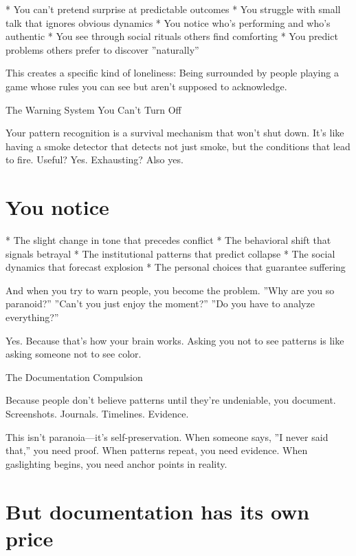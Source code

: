 \documentclass[12pt,oneside]{book}
\begin{document}
                    * You can't pretend surprise at predictable outcomes
                    * You struggle with small talk that ignores obvious dynamics
                    * You notice who's performing and who's authentic
                    * You see through social rituals others find comforting
                    * You predict problems others prefer to discover ''naturally''

This creates a specific kind of loneliness: Being surrounded by people playing a game whose rules you can see but aren't supposed to acknowledge.

The Warning System You Can't Turn Off

Your pattern recognition is a survival mechanism that won't shut down. It's like having a smoke detector that detects not just smoke, but the conditions that lead to fire. Useful? Yes. Exhausting? Also yes.

\section{You notice}

                    * The slight change in tone that precedes conflict
                    * The behavioral shift that signals betrayal
                    * The institutional patterns that predict collapse
                    * The social dynamics that forecast explosion
                    * The personal choices that guarantee suffering

And when you try to warn people, you become the problem. ''Why are you so paranoid?'' ''Can't you just enjoy the moment?'' ''Do you have to analyze everything?''

Yes. Because that's how your brain works. Asking you not to see patterns is like asking someone not to see color.

The Documentation Compulsion

Because people don't believe patterns until they're undeniable, you document. Screenshots. Journals. Timelines. Evidence.

This isn't paranoia---it's self-preservation. When someone says, ''I never said that,'' you need proof. When patterns repeat, you need evidence. When gaslighting begins, you need anchor points in reality.

\section{But documentation has its own price}
\end{document}
